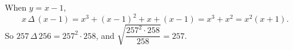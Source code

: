 When $y=x-1$,
\[x\,\Delta\,(x-1)=x^3+(x-1)^2+x+(x-1)=x^3+x^2=x^2(x+1).\]
So $257\,\Delta\,256=257^2\cdot258$, and $\sqrt{\dfrac{257^2\cdot258}{258}}=\boxed{257}$.

